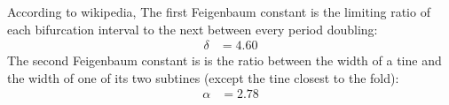 \documentclass[12pt,a4paper]{article}
\begin{document}
			According to wikipedia, The first Feigenbaum constant is  the limiting ratio of each bifurcation interval to the next between every period doubling:
			\begin{align*}
				\delta &= 4.60
			\end{align*}
			The second Feigenbaum constant is is the ratio between the width of a tine and the width of one of its two subtines (except the tine closest to the fold):
			\begin{align}
				\alpha &= 2.78
			\end{align}
			
			
\end{document}
